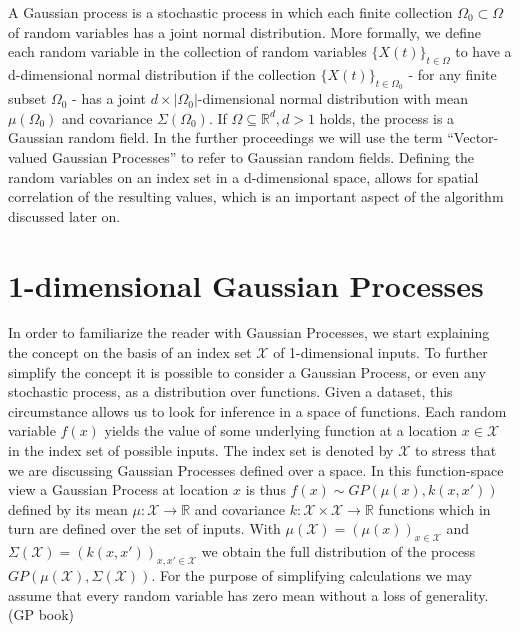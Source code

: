 A Gaussian process is a stochastic process in which each finite collection $\Omega_{0} \subset \Omega$ of random variables has a joint normal distribution. More formally, we define each random variable in the collection of random variables $\{X(t)\}_{t \in \Omega}$ to have a d-dimensional normal distribution if the collection $\{X(t)\}_{t \in \Omega_{0}}$ - for any finite subset $\Omega_{0}$ - has a joint $d\times \left| \Omega_{0} \right|$-dimensional normal distribution with mean
$\mu (\Omega_{0})$ and covariance $\Sigma (\Omega_{0})$.  
If $\Omega \subseteq \mathbb{R}^{d}, d>1$ holds, the process is a Gaussian random field. In the further proceedings we will use the term ``Vector-valued Gaussian Processes'' to refer to Gaussian random fields. Defining the random variables on an index set in a d-dimensional space, allows for spatial correlation of the resulting values, which is an important aspect of the algorithm discussed later on.

\section{1-dimensional Gaussian Processes}
In order to familiarize the reader with Gaussian Processes, we start explaining the concept on the basis of an index set $\mathcal{X}$ of 1-dimensional inputs. To further simplify the concept it is possible to consider a Gaussian Process, or even any stochastic process, as a distribution over functions. Given a dataset, this circumstance allows us to look for inference in a space of functions. Each random variable $f(x)$ yields the value of some underlying function at a location $x \in
\mathcal{X}$ in the index set of possible inputs. The index set is denoted by $\mathcal{X}$ to stress that we are discussing Gaussian Processes defined over a space. In this function-space view a Gaussian Process at location $x$ is thus $f(x) \sim GP(\mu(x), k(x,x'))$ defined by its mean $\mu:\mathcal{X} \rightarrow \mathbb{R}$ and covariance $k:\mathcal{X} \times \mathcal{X} \rightarrow \mathbb{R}$ functions which in turn are defined over the set of inputs. With $\mu(\mathcal{X})=(\mu(x))_{x \in \mathcal{X}}$ and $\Sigma(\mathcal{X})=(k(x,x'))_{x,x' \in \mathcal{X}}$ we obtain the full distribution of the process $GP(\mu(\mathcal{X}),
\Sigma(\mathcal{X}))$. For the purpose of simplifying calculations we may assume that every random variable has zero mean without a loss of generality. (GP book)

